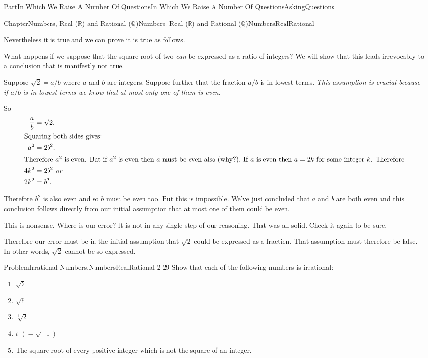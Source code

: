 \documentclass[oneside,10pt,]{book}
\numberwithin{equation}{part}
\newcommand{\RR}{\mathbb {R}}
\newcommand{\QQ}{\mathbb {Q}}
\newcommand{\amp}{&}
\begin{document}
\begin{partptx}{Part}{In Which We Raise A Number Of Questions}{}{In Which We Raise A Number Of Questions}{}{}{AskingQuestions}
\begin{chapterptx}{Chapter}{Numbers, Real (\(\RR\)) and Rational (\(\QQ\))}{}{Numbers, Real (\(\RR\)) and Rational (\(\QQ\))}{}{}{NumbersRealRational}
\begin{introduction}{}
\par
Nevertheless it is true and we can prove it is true as follows.%
\par
What happens if we suppose that the square root of two \emph{can} be expressed as a ratio of integers? We will show that this leads irrevocably to a conclusion that is manifestly not true.%
\par
Suppose \(\sqrt{2}=a/b\) where \(a\) and \(b\) are integers. Suppose further that the fraction \(a/b\) is in lowest terms. \emph{This assumption is crucial because if \(a/b\) is in lowest terms we know that at most only one of them is even.}%
\par
So%
\begin{align*}
\frac{a}{b} \amp = \sqrt{2}.\\
\intertext{Squaring both sides gives:}
a^2 \amp = 2b^2.\\
\intertext{Therefore \(a^2\) is even. But if \(a^2\) is even then \(a\) must be even also (why?). If \(a\) is even then \(a=2k\) for some integer \(k\). Therefore}
4k^2\amp =2b^2\textit{ or}\\
2k^2\amp = b^2\text{.}
\end{align*}
%
\par
Therefore \(b^2\) is also even and so \(b\) must be even too. But this is impossible. We've just concluded that \(a\) and \(b\) are both even and this conclusion follows directly from our initial assumption that at most one of them could be even.%
\par
This is nonsense. Where is our error? It is not in any single step of our reasoning. That was all solid. Check it again to be sure.%
\par
Therefore our error must be in the initial assumption that \(\sqrt{2}\) could be expressed as a fraction. That assumption must therefore be false. In other words, \(\sqrt{2}\) cannot be so expressed.%
\begin{problem}{Problem}{Irrational Numbers.}{NumbersRealRational-2-29}%
Show that each of the following numbers is irrational:%
\begin{enumerate}[font=\bfseries,label=(\alph*),ref=\alph*]%
\item{}\(\sqrt{3}\)%
\item{}\(\sqrt{5}\)%
\item{}\(\sqrt[3]{2}\)%
\item{}\(i\) \((=\sqrt{-1})\)%
\item{}The square root of every positive integer which is not the square of an integer.%
\end{enumerate}%

\end{problem}
\end{introduction}
\end{chapterptx}
\end{partptx}
\end{document}
